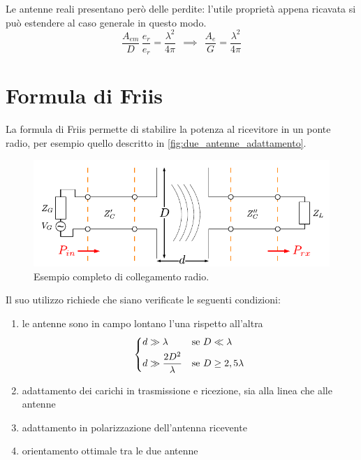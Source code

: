 Le antenne reali presentano però delle perdite: l'utile proprietà appena ricavata si può estendere al caso generale in questo modo.
\begin{equation*}
	\frac{A_{em}}{D} \, \frac{e_r}{e_r}
	= \frac{\lambda^2}{4\pi}
	~~ \implies ~~
	\frac{A_{e}}{G}
	= \frac{\lambda^2}{4\pi}
\end{equation*}

\section{Formula di Friis}
La formula di Friis permette di stabilire la potenza al ricevitore in un ponte radio, per esempio quello descritto in \autoref{fig:due_antenne_adattamento}.

\begin{figure}[htp]
	\centering
	\includegraphics[]{img/due_antenne_adattamento.pdf}
	\caption{Esempio completo di collegamento radio.}
	\label{fig:due_antenne_adattamento}
\end{figure}

Il suo utilizzo richiede che siano verificate le seguenti condizioni:
\begin{enumerate}
	\item le antenne sono in campo lontano l'una rispetto all'altra
	\begin{equation*}\begin{dcases}
		d\gg \lambda & \text{se } D \ll \lambda \\
		d \gg \frac{2D^2}{\lambda} & \text{se } D\ge 2,5\lambda
	\end{dcases}\end{equation*}
	\item adattamento dei carichi in trasmissione e ricezione, sia alla linea che alle antenne
	\item adattamento in polarizzazione dell'antenna ricevente
	\item orientamento ottimale tra le due antenne
\end{enumerate}


